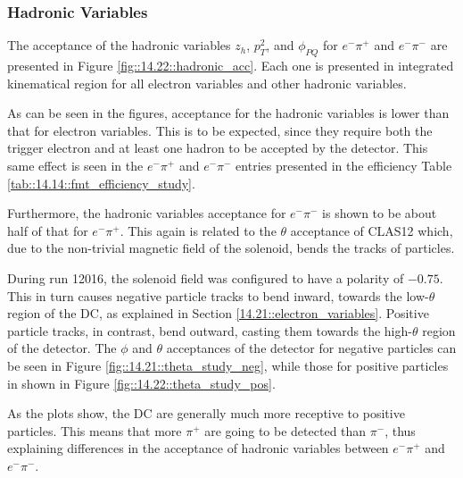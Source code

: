 \subsubsection{Hadronic Variables}
\label{14.22::hadronic_variables}
    The acceptance of the hadronic variables $z_h$, $p_T^2$, and $\phi_{PQ}$ for $e^-\pi^+$ and $e^-\pi^-$ are presented in Figure \ref{fig::14.22::hadronic_acc}.
    Each one is presented in integrated kinematical region for all electron variables and other hadronic variables.

    As can be seen in the figures, acceptance for the hadronic variables is lower than that for electron variables.
    This is to be expected, since they require both the trigger electron and at least one hadron to be accepted by the detector.
    This same effect is seen in the $e^-\pi^+$ and $e^-\pi^-$ entries presented in the efficiency Table \ref{tab::14.14::fmt_efficiency_study}.

    Furthermore, the hadronic variables acceptance for $e^-\pi^-$ is shown to be about half of that for $e^-\pi^+$.
    This again is related to the $\theta$ acceptance of CLAS12 which, due to the non-trivial magnetic field of the solenoid, bends the tracks of particles.

    During run 12016, the solenoid field was configured to have a polarity of $-0.75$.
    This in turn causes negative particle tracks to bend inward, towards the low-$\theta$ region of the DC, as explained in Section \ref{14.21::electron_variables}.
    Positive particle tracks, in contrast, bend outward, casting them towards the high-$\theta$ region of the detector.
    The $\phi$ and $\theta$ acceptances of the detector for negative particles can be seen in Figure \ref{fig::14.21::theta_study_neg}, while those for positive particles in shown in Figure \ref{fig::14.22::theta_study_pos}.

    As the plots show, the DC are generally much more receptive to positive particles.
    This means that more $\pi^+$ are going to be detected than $\pi^-$, thus explaining differences in the acceptance of hadronic variables between $e^-\pi^+$ and $e^-\pi^-$.


